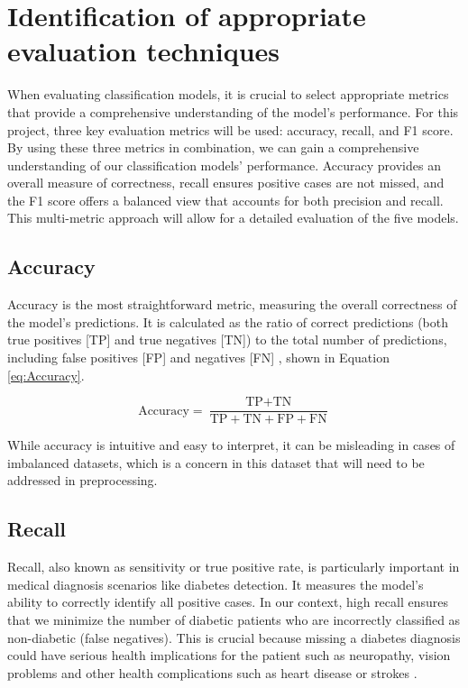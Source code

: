 \documentclass[12pt]{report}
\newcommand{\para}{\vspace{8pt}\noindent}
\begin{document}
\pagebreak
\section{Identification of appropriate evaluation techniques}
When evaluating classification models, it is crucial to select appropriate metrics that provide a comprehensive understanding of the model's performance.
For this project, three key evaluation metrics will be used: accuracy, recall, and F1 score. 
By using these three metrics in combination, we can gain a comprehensive understanding of our classification models' performance. Accuracy provides an overall measure of correctness,
recall ensures positive cases are not missed, and the F1 score offers a balanced view that accounts for both precision and recall.
This multi-metric approach will allow for a detailed evaluation of the five models.

\subsection{Accuracy}
Accuracy is the most straightforward metric, measuring the overall correctness of the model's predictions. It is calculated as the ratio of correct predictions
(both true positives [TP] and true negatives [TN]) to the total number of predictions, including false positives [FP] and negatives [FN] \autocite{google_classification_nodate},
shown in Equation \ref{eq:Accuracy}.

\begin{equation}\label{eq:Accuracy}
    \text{Accuracy} = \frac{\text{TP} + \text{TN}}{\text{TP} + \text{TN} + \text{FP} + \text{FN}}
\end{equation}


\para While accuracy is intuitive and easy to interpret, it can be misleading in cases
of imbalanced datasets, which is a concern in this dataset that will need to be addressed in preprocessing.

\subsection{Recall}
Recall, also known as sensitivity or true positive rate, is particularly important in medical diagnosis scenarios like diabetes detection. It measures
the model's ability to correctly identify all positive cases. In our context, high recall ensures that we minimize the number of diabetic patients
who are incorrectly classified as non-diabetic (false negatives). This is crucial because missing a diabetes diagnosis could have serious health implications for the patient such 
as neuropathy, vision problems and other health complications such as heart disease or strokes \autocite{nhs_type_nodate}.
\end{document}
